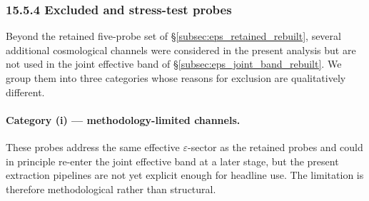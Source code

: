 %
%
%

\subsubsection*{\normalfont\textbf{15.5.4 \quad Excluded and stress-test probes}}
\label{subsec:eps_excluded_rebuilt}

Beyond the retained five-probe set of \S\ref{subsec:eps_retained_rebuilt},
several additional cosmological channels were considered in the present
analysis but are not used in the joint effective band of
\S\ref{subsec:eps_joint_band_rebuilt}. We group them into three
categories whose reasons for exclusion are qualitatively different.

\paragraph{Category (i) --- methodology-limited channels.}
These probes address the same effective $\varepsilon$-sector as the
retained probes and could in principle re-enter the joint effective
band at a later stage, but the present extraction pipelines are not
yet explicit enough for headline use. The limitation is therefore
methodological rather than structural.

